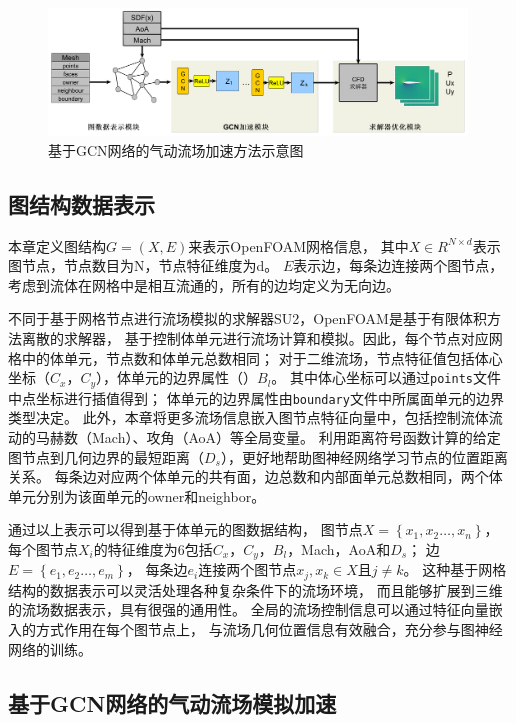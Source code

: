 \begin{figure}[htp]
	\centering
	\includegraphics[width=0.99\textwidth]{figures/data/architecture2.pdf}
	\caption{基于GCN网络的气动流场加速方法示意图}
	\label{fig:gcnflow}
\end{figure}


\subsection{图结构数据表示}

本章定义图结构$G=\left(X, E\right)$来表示OpenFOAM网格信息，
其中$X \in R^{N \times d}$表示图节点，节点数目为N，节点特征维度为d。
$E$表示边，每条边连接两个图节点，考虑到流体在网格中是相互流通的，所有的边均定义为无向边。

不同于基于网格节点进行流场模拟的求解器SU2\cite{2015SU2}，OpenFOAM是基于有限体积方法离散的求解器，
基于控制体单元进行流场计算和模拟。因此，每个节点对应网格中的体单元，节点数和体单元总数相同；
对于二维流场，节点特征值包括体心坐标（$C_x$，$C_y$），体单元的边界属性（）$B_l$。
其中体心坐标可以通过\texttt{points}文件中点坐标进行插值得到；
体单元的边界属性由\texttt{boundary}文件中所属面单元的边界类型决定。
此外，本章将更多流场信息嵌入图节点特征向量中，包括控制流体流动的马赫数（Mach）、攻角（AoA）等全局变量。
利用距离符号函数计算的给定图节点到几何边界的最短距离（$D_s$），更好地帮助图神经网络学习节点的位置距离关系。
每条边对应两个体单元的共有面，边总数和内部面单元总数相同，两个体单元分别为该面单元的owner和neighbor。

通过以上表示可以得到基于体单元的图数据结构，
图节点$X=\left\{x_1, x_2 \ldots, x_n \right\}$，
每个图节点$X_i$的特征维度为6包括$C_x$，$C_y$，$B_l$，Mach，AoA和$D_s$；
边$E = \left\{e_1, e_2 \ldots, e_m \right\}$，
每条边$e_i$连接两个图节点$x_j,x_k \in X$且$j\not= k$。
这种基于网格结构的数据表示可以灵活处理各种复杂条件下的流场环境，
而且能够扩展到三维的流场数据表示，具有很强的通用性。
全局的流场控制信息可以通过特征向量嵌入的方式作用在每个图节点上，
与流场几何位置信息有效融合，充分参与图神经网络的训练。

\subsection{基于GCN网络的气动流场模拟加速}


